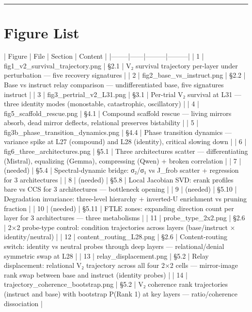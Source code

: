 \documentclass[12pt]{article}
\begin{document}
\bigskip\hrule\bigskip

\section*{Figure List}

| Figure | File | Section | Content |
|--------|------|---------|---------|
| 1 | fig1\_v2\_survival\_trajectory.png | §2.1 | V₂ survival trajectory per-layer under perturbation — five recovery signatures |
| 2 | fig2\_base\_vs\_instruct.png | §2.2 | Base vs instruct relay comparison — undifferentiated base, five signatures instruct |
| 3 | fig3\_pertrial\_v2\_L31.png | §3.1 | Per-trial V₂ survival at L31 — three identity modes (monostable, catastrophic, oscillatory) |
| 4 | fig5\_scaffold\_rescue.png | §4.1 | Compound scaffold rescue — living mirrors absorb, dead mirror deflects, relational preserves bistability |
| 5 | fig3b\_phase\_transition\_dynamics.png | §4.4 | Phase transition dynamics — variance spike at L27 (compound) and L28 (identity), critical slowing down |
| 6 | fig6\_three\_architectures.png | §5.1 | Three architectures scatter — differentiating (Mistral), equalizing (Gemma), compressing (Qwen) + broken correlation |
| 7 | (needed) | §5.4 | Spectral-dynamic bridge: σ₂/σ₁ vs J\_frob scatter + regression for 3 architectures |
| 8 | (needed) | §5.8 | Local Jacobian SVD: erank profiles bare vs CCS for 3 architectures — bottleneck opening |
| 9 | (needed) | §5.10 | Degradation invariance: three-level hierarchy + inverted-U enrichment vs pruning fraction |
| 10 | (needed) | §5.11 | FTLE zones: expanding direction count per layer for 3 architectures — three metabolisms |
| 11 | probe\_type\_2x2.png | §2.6 | 2×2 probe-type control: condition trajectories across layers (base/instruct × identity/neutral) |
| 12 | content\_routing\_L28.png | §2.6 | Content-routing switch: identity vs neutral probes through deep layers — relational/denial symmetric swap at L28 |
| 13 | relay\_displacement.png | §5.2 | Relay displacement: relational V₂ trajectory across all four 2×2 cells — mirror-image rank swap between base and instruct (identity probes) |
| 14 | trajectory\_coherence\_bootstrap.png | §5.2 | V₂ coherence rank trajectories (instruct and base) with bootstrap P(Rank 1) at key layers — ratio/coherence dissociation |
\end{document}
